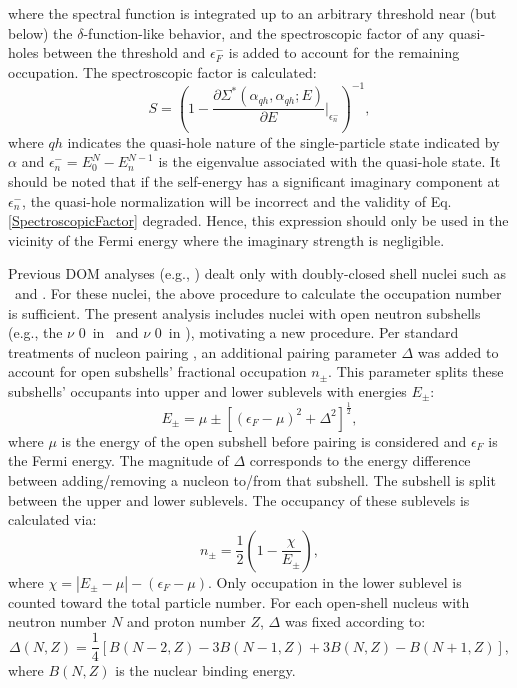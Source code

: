 where the spectral function is integrated up to an arbitrary threshold near (but below) the
$\delta$-function-like behavior, and the spectroscopic factor of any quasi-holes between the threshold and
$\epsilon_{F}^{-}$ is added to account for the remaining occupation. The spectroscopic factor is
calculated:
\begin{equation} \label{SpectroscopicFactor}
    S = \left(1-\frac{\partial\Sigma^{*}(\alpha_{qh},\alpha_{qh};E)}
    {\partial{E}}\bigg\rvert_{\epsilon_{n}^{-}}\right)^{-1},
\end{equation}
where $qh$ indicates the quasi-hole nature of the single-particle state indicated
by $\alpha$ and $\epsilon_{n}^{-} = E_{0}^{N}-E_{n}^{N-1}$ is the
eigenvalue associated with the quasi-hole state. It should be noted that if the
self-energy has a significant imaginary component at $\epsilon_{n}^{-}$, the
quasi-hole normalization will be incorrect and the validity of Eq.
\ref{SpectroscopicFactor} degraded. Hence, this expression should only be used
in the vicinity of the Fermi energy where the imaginary strength is negligible.

Previous DOM analyses (e.g., \cite{MahzoonPhDThesis}) dealt only with doubly-closed 
shell nuclei such as \caForty\ and \caEight.
For these nuclei, the above procedure to calculate the occupation number is
sufficient. The present analysis includes nuclei with open neutron subshells
(e.g., the $\nu$ 0\dFive\ in \oEight\ and $\nu$ 0\fFive\ in \niEight)\footnotemark, motivating a new
procedure. Per standard treatments of nucleon pairing \cite{BohrAndMottelson}, an additional
pairing parameter $\Delta$ was added to account for open subshells' fractional occupation $n_{\pm}$.
This parameter splits these subshells' occupants into upper and lower sublevels with energies 
$E_{\pm}$:
\begin{equation}
    E_{\pm} = \mu \pm [(\epsilon_{F}-\mu)^{2} + \Delta^{2}]^{\frac{1}{2}},
\end{equation}
where $\mu$ is the energy of the open subshell before pairing is considered and
$\epsilon_{F}$ is the Fermi
energy. The magnitude of $\Delta$ corresponds to the energy difference between
adding/removing a nucleon to/from that subshell. The subshell
is split between the upper and lower sublevels. The occupancy of these sublevels is calculated via:
\begin{equation}
    n_{\pm} = \frac{1}{2}\left( 1-\frac{\chi}{E_{\pm}}\right),
\end{equation}
where $\chi = |E_{\pm}-\mu| - (\epsilon_{F} - \mu)$. Only occupation in the
lower sublevel is counted toward the total particle number. For each open-shell
nucleus with neutron number $N$ and proton number $Z$, $\Delta$ was fixed according to:
\begin{equation}
    \Delta(N,Z) = \frac{1}{4}\left[B(N-2,Z)-3B(N-1,Z) + 3B(N,Z)-B(N+1,Z)\right],
\end{equation}
where $B(N,Z)$ is the nuclear binding energy.

